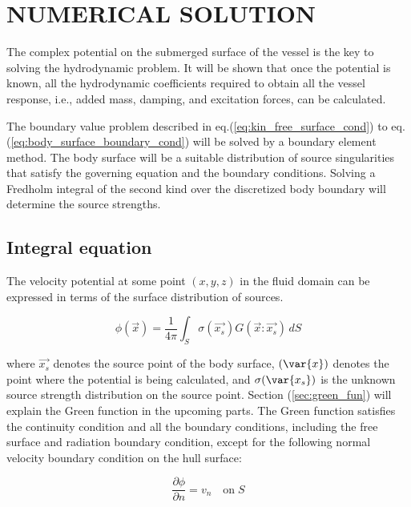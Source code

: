 \chapter{NUMERICAL SOLUTION}
The complex potential on the submerged surface of the vessel is the key to solving the hydrodynamic problem. It will be shown that once the potential is known, all the hydrodynamic coefficients required to obtain all the vessel response, i.e., added mass, damping, and excitation forces, can be calculated.

The boundary value problem described in eq.(\ref{eq:kin_free_surface_cond}) to eq.(\ref{eq:body_surface_boundary_cond})  will be solved by a boundary element method. The body surface will be a suitable distribution of source singularities that satisfy the governing equation and the boundary conditions. Solving a Fredholm integral of the second kind over the discretized body boundary will determine the source strengths. 

\section{Integral equation}
The velocity potential at some point $(x, y, z)$ in the fluid domain can be expressed in terms of the surface distribution of sources.

\begin{equation}
    \label{eq:vel_pot}
    \phi(\vec{x}) = \frac{1}{4\pi}\int_S \sigma(\vec{x_s})G(\vec{x}:\vec{x_s})\,dS
\end{equation}

where $\vec{x_s}$ denotes the source point of the body surface, $(\var{x})$ denotes the point where the potential is being calculated, and $\sigma(\var{x_s})$ is the unknown source strength distribution on the source point. Section (\ref{sec:green_fun}) will explain the Green function in the upcoming parts. 
The Green function satisfies the continuity condition and all the boundary conditions, including the free surface and radiation boundary condition, except for the following normal velocity boundary condition on the hull surface:

\begin{equation}
    \label{eq:vel_boundary_cond}
    \frac{\partial \phi}{\partial n} = v_n \quad \text{on}\; S
\end{equation}

